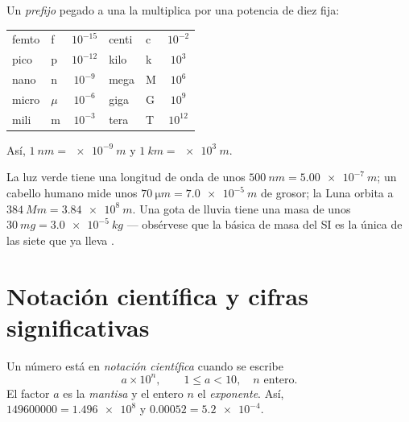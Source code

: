 \begin{definition}\label{def:g10:orders-of-magnitude:prefixes}
Un \emph{prefijo} pegado a una  la multiplica
por una potencia de diez fija:
\begin{center}
\begin{tabular}{llc@{\qquad\qquad}llc}
femto & f & $10^{-15}$ & centi & c & $10^{-2}$ \\
pico  & p & $10^{-12}$ & kilo  & k & $10^{3}$  \\
nano  & n & $10^{-9}$  & mega  & M & $10^{6}$  \\
micro & $\mu$ & $10^{-6}$ & giga & G & $10^{9}$ \\
mili  & m & $10^{-3}$  & tera  & T & $10^{12}$ \\
\end{tabular}
\end{center}
Así, $\qty{1}{nm} = \qty{e-9}{m}$ y $\qty{1}{km} = \qty{e3}{m}$.
\end{definition}

\begin{example}\label{ex:g10:orders-of-magnitude:prefixes}
La luz verde tiene una longitud de onda de unos
$\qty{500}{nm} = \qty{5.00e-7}{m}$; un cabello humano mide unos
$\qty{70}{\micro m} = \qty{7.0e-5}{m}$ de grosor; la Luna orbita a
$\qty{384}{Mm} = \qty{3.84e8}{m}$. Una gota de lluvia tiene una masa de
unos $\qty{30}{mg} = \qty{3.0e-5}{kg}$ --- obsérvese que la 
básica de masa del SI es la única de las siete que ya lleva .
\end{example}

\section{Notación científica y cifras significativas}

\begin{definition}\label{def:g10:orders-of-magnitude:scinot}
Un número está en \emph{notación científica}
cuando se escribe
\[
a \times 10^{n}, \qquad 1 \leq a < 10, \quad n \text{ entero.}
\]
El factor $a$ es la \emph{mantisa} y el entero $n$ el
\emph{exponente}. Así,
$\num{149600000} = \num{1.496e8}$ y $\num{0.00052} = \num{5.2e-4}$.
\end{definition}

